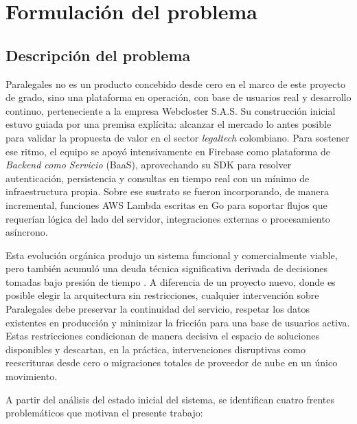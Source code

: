 \section{Formulación del problema}

\subsection{Descripción del problema}
Paralegales no es un producto concebido desde cero en el marco de este proyecto de grado, sino una plataforma en operación, con base de usuarios real y desarrollo continuo, perteneciente a la empresa Webcloster S.A.S. Su construcción inicial estuvo guiada por una premisa explícita: alcanzar el mercado lo antes posible para validar la propuesta de valor en el sector \textit{legaltech} colombiano. Para sostener ese ritmo, el equipo se apoyó intensivamente en Firebase como plataforma de \textit{Backend como Servicio} (BaaS), aprovechando su SDK para resolver autenticación, persistencia y consultas en tiempo real con un mínimo de infraestructura propia. Sobre ese sustrato se fueron incorporando, de manera incremental, funciones AWS Lambda escritas en Go para soportar flujos que requerían lógica del lado del servidor, integraciones externas o procesamiento asíncrono.

Esta evolución orgánica produjo un sistema funcional y comercialmente viable, pero también acumuló una deuda técnica significativa derivada de decisiones tomadas bajo presión de tiempo \cite{BirrEngwall2024}. A diferencia de un proyecto nuevo, donde es posible elegir la arquitectura sin restricciones, cualquier intervención sobre Paralegales debe preservar la continuidad del servicio, respetar los datos existentes en producción y minimizar la fricción para una base de usuarios activa. Estas restricciones condicionan de manera decisiva el espacio de soluciones disponibles y descartan, en la práctica, intervenciones disruptivas como reescrituras desde cero o migraciones totales de proveedor de nube en un único movimiento.

A partir del análisis del estado inicial del sistema, se identifican cuatro frentes problemáticos que motivan el presente trabajo:

